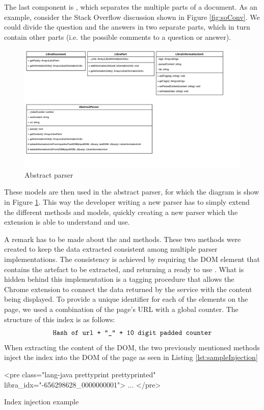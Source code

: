 The last component is , which separates the multiple parts of a document. As an example, consider the Stack Overflow discussion shown in Figure \ref{fig:soConv}. We could divide the question and the answers in two separate parts, which in turn  contain other parts (i.e. the possible comments to a question or answer). 

\begin{figure}[H]
\centering
\includegraphics[scale=0.5]{Figures/AbstractParserUML}
\caption{Abstract parser}
\label{fig:abstractParserDiagram}
\end{figure}

These models are then used in the abstract parser, for which the diagram is show in Figure \ref{fig:abstractParserDiagram}. This way the developer writing a new parser has to simply extend the different methods and models, quickly creating a new parser which the extension is able to understand and use. 

A remark has to be made about the  and  methods. These two methods were created to keep the data extracted consistent among multiple parser implementations. The consistency is achieved by requiring the DOM element that contains the artefact to be extracted, and returning a ready to use . What is hidden behind this implementation is a tagging procedure that allows the Chrome extension to connect the data returned by the service with the content being displayed. To provide a unique identifier for each of the elements on the page, we used a combination of the page's URL with a global counter. The structure of this index is as follows:
\[
\text{\texttt{Hash of url + "\_" + 10 digit padded counter}}
\]
When extracting the content of the DOM, the two previously mentioned methods inject the index into the DOM of the page as seen in Listing \ref{lst:sampleInjection}
\begin{listing}
\centering
\begin{htmlcode}
<pre class="lang-java prettyprint prettyprinted" libra_idx="-656298628_0000000001">
    ...
</pre>
\end{htmlcode}
\caption{Index injection example}
\label{lst:sampleInjection}
\end{listing}


